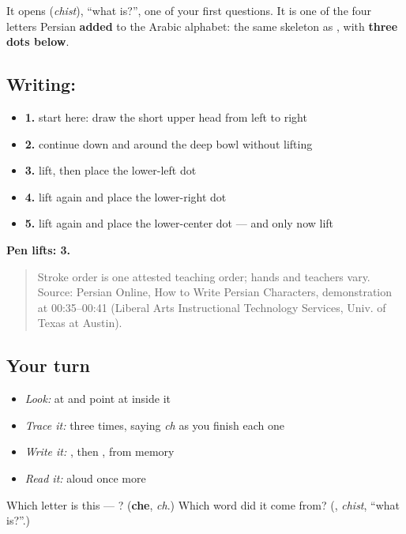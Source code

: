It opens \textbf{} (\emph{chist}), \textquotedblleft{}what is?\textquotedblright{}, one of your first questions. It is one of the four letters Persian \textbf{added} to the Arabic alphabet: the same skeleton as \textbf{}, with \textbf{three dots below}.

\subsection*{Writing: }

\begin{itemize}
\raggedright
  \item \textbf{1.} start here: draw the short upper head from left to right
  \item \textbf{2.} continue down and around the deep bowl without lifting
  \item \textbf{3.} lift, then place the lower-left dot
  \item \textbf{4.} lift again and place the lower-right dot
  \item \textbf{5.} lift again and place the lower-center dot — and only now lift
\end{itemize}

\textbf{Pen lifts: 3.}

\begin{quote}
Stroke order is one attested teaching order; hands and teachers vary. Source: Persian Online, How to Write Persian Characters,  demonstration at 00:35–00:41 (Liberal Arts Instructional Technology Services, Univ. of Texas at Austin).
\end{quote}

\subsection*{Your turn}
\begin{itemize}
\raggedright
  \item \emph{Look:} at \textbf{} and point at  inside it
  \item \emph{Trace it:}  three times, saying \emph{ch} as you finish each one
  \item \emph{Write it:} , then , from memory
  \item \emph{Read it:} \textbf{} aloud once more
\end{itemize}

\begin{tcolorbox}[breakable,colback=teal!4,colframe=teal!35!black,title={Before you move on}]
Which letter is this — ? (\textbf{che}, \emph{ch}.) Which word did it come from? (\textbf{}, \emph{chist}, \textquotedblleft{}what is?\textquotedblright{}.)
\end{tcolorbox}
